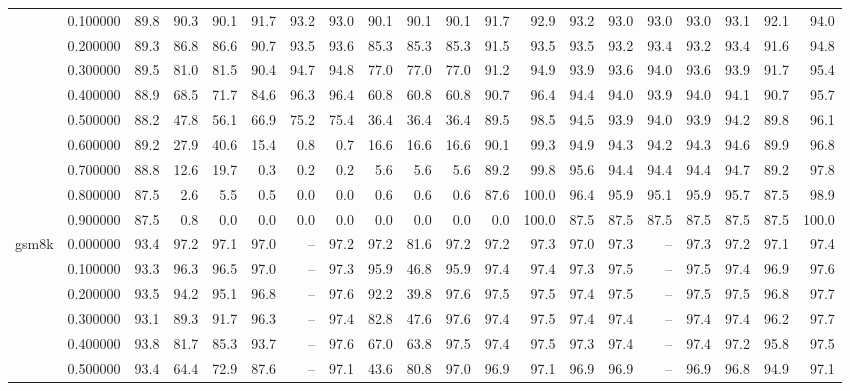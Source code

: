\begin{tabular}{llrrrrrrrrrrrrrrrrrr}
 & 0.100000 & 89.8 & 90.3 & 90.1 & 91.7 & 93.2 & 93.0 & 90.1 & 90.1 & 90.1 & 91.7 & 92.9 & 93.2 & 93.0 & 93.0 & 93.0 & 93.1 & 92.1 & 94.0 \\
 & 0.200000 & 89.3 & 86.8 & 86.6 & 90.7 & 93.5 & 93.6 & 85.3 & 85.3 & 85.3 & 91.5 & 93.5 & 93.5 & 93.2 & 93.4 & 93.2 & 93.4 & 91.6 & 94.8 \\
 & 0.300000 & 89.5 & 81.0 & 81.5 & 90.4 & 94.7 & 94.8 & 77.0 & 77.0 & 77.0 & 91.2 & 94.9 & 93.9 & 93.6 & 94.0 & 93.6 & 93.9 & 91.7 & 95.4 \\
 & 0.400000 & 88.9 & 68.5 & 71.7 & 84.6 & 96.3 & 96.4 & 60.8 & 60.8 & 60.8 & 90.7 & 96.4 & 94.4 & 94.0 & 93.9 & 94.0 & 94.1 & 90.7 & 95.7 \\
 & 0.500000 & 88.2 & 47.8 & 56.1 & 66.9 & 75.2 & 75.4 & 36.4 & 36.4 & 36.4 & 89.5 & 98.5 & 94.5 & 93.9 & 94.0 & 93.9 & 94.2 & 89.8 & 96.1 \\
 & 0.600000 & 89.2 & 27.9 & 40.6 & 15.4 & 0.8 & 0.7 & 16.6 & 16.6 & 16.6 & 90.1 & 99.3 & 94.9 & 94.3 & 94.2 & 94.3 & 94.6 & 89.9 & 96.8 \\
 & 0.700000 & 88.8 & 12.6 & 19.7 & 0.3 & 0.2 & 0.2 & 5.6 & 5.6 & 5.6 & 89.2 & 99.8 & 95.6 & 94.4 & 94.4 & 94.4 & 94.7 & 89.2 & 97.8 \\
 & 0.800000 & 87.5 & 2.6 & 5.5 & 0.5 & 0.0 & 0.0 & 0.6 & 0.6 & 0.6 & 87.6 & 100.0 & 96.4 & 95.9 & 95.1 & 95.9 & 95.7 & 87.5 & 98.9 \\
 & 0.900000 & 87.5 & 0.8 & 0.0 & 0.0 & 0.0 & 0.0 & 0.0 & 0.0 & 0.0 & 0.0 & 100.0 & 87.5 & 87.5 & 87.5 & 87.5 & 87.5 & 87.5 & 100.0 \\
\cline{1-20}
\multirow[t]{10}{*}{gsm8k} & 0.000000 & 93.4 & 97.2 & 97.1 & 97.0 & -- & 97.2 & 97.2 & 81.6 & 97.2 & 97.2 & 97.3 & 97.0 & 97.3 & -- & 97.3 & 97.2 & 97.1 & 97.4 \\
 & 0.100000 & 93.3 & 96.3 & 96.5 & 97.0 & -- & 97.3 & 95.9 & 46.8 & 95.9 & 97.4 & 97.4 & 97.3 & 97.5 & -- & 97.5 & 97.4 & 96.9 & 97.6 \\
 & 0.200000 & 93.5 & 94.2 & 95.1 & 96.8 & -- & 97.6 & 92.2 & 39.8 & 97.6 & 97.5 & 97.5 & 97.4 & 97.5 & -- & 97.5 & 97.5 & 96.8 & 97.7 \\
 & 0.300000 & 93.1 & 89.3 & 91.7 & 96.3 & -- & 97.4 & 82.8 & 47.6 & 97.6 & 97.4 & 97.5 & 97.4 & 97.4 & -- & 97.4 & 97.4 & 96.2 & 97.7 \\
 & 0.400000 & 93.8 & 81.7 & 85.3 & 93.7 & -- & 97.6 & 67.0 & 63.8 & 97.5 & 97.4 & 97.5 & 97.3 & 97.4 & -- & 97.4 & 97.2 & 95.8 & 97.5 \\
 & 0.500000 & 93.4 & 64.4 & 72.9 & 87.6 & -- & 97.1 & 43.6 & 80.8 & 97.0 & 96.9 & 97.1 & 96.9 & 96.9 & -- & 96.9 & 96.8 & 94.9 & 97.1 \\

\end{tabular}
